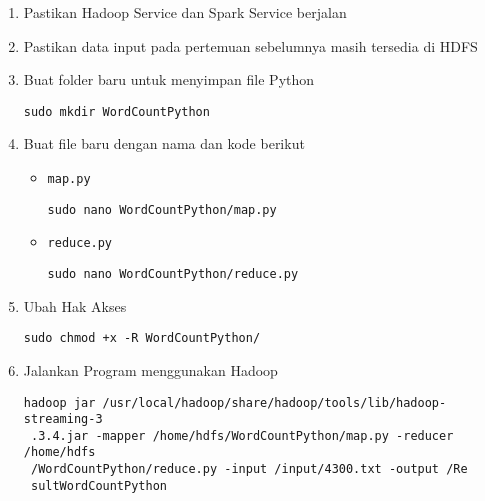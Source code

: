 \documentclass[a4paper]{tufte-handout}
\begin{document}
\begin{enumerate}
\item Pastikan Hadoop Service dan Spark Service berjalan
\item Pastikan data input pada pertemuan sebelumnya masih tersedia di HDFS
\item Buat folder baru untuk menyimpan file Python
\begin{lstlisting}[language=Terminal]
 sudo mkdir WordCountPython
\end{lstlisting}

\item Buat file baru dengan nama dan kode berikut
\begin{itemize}
\item {\tt map.py}
\begin{lstlisting}[language=Terminal]
 sudo nano WordCountPython/map.py
\end{lstlisting}
 


\item {\tt reduce.py}
\begin{lstlisting}[language=Terminal]
 sudo nano WordCountPython/reduce.py
\end{lstlisting} 

\end{itemize}

\item Ubah Hak Akses
\begin{lstlisting}[language=Terminal]
 sudo chmod +x -R WordCountPython/
\end{lstlisting}


\item Jalankan Program menggunakan Hadoop
\begin{lstlisting}[language=Terminal]
 hadoop jar /usr/local/hadoop/share/hadoop/tools/lib/hadoop-streaming-3
 .3.4.jar -mapper /home/hdfs/WordCountPython/map.py -reducer /home/hdfs
 /WordCountPython/reduce.py -input /input/4300.txt -output /Re
 sultWordCountPython
\end{lstlisting}


\end{enumerate}
\end{document}
